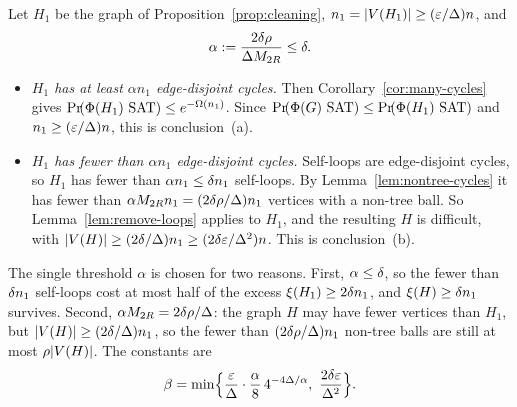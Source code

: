 \documentclass[11pt,a4paper]{article}
\theoremstyle{definition}
\theoremstyle{remark}
\theoremstyle{plain}
\theoremstyle{definition}
\begin{document}
Let \(H_1\) be the graph of Proposition~\ref{prop:cleaning},
\(n_1=|V(H_1)|\ge(\varepsilon/\Delta)n\), and
\[
  \alpha:=\frac{2\delta\rho}{\Delta M_{2R}}\le\delta .
\]
\begin{itemize}
\item \emph{\(H_1\) has at least \(\alpha n_1\) edge-disjoint cycles.} Then
  Corollary~\ref{cor:many-cycles} gives
  \(\Prx{\rform{H_1}\SAT}\le e^{-\Omega(n_1)}\). Since
  \(\Prx{\rform{\Gin}\SAT}\le\Prx{\rform{H_1}\SAT}\) and \(n_1\ge(\varepsilon/\Delta)n\),
  this is conclusion~(a).
\item \emph{\(H_1\) has fewer than \(\alpha n_1\) edge-disjoint cycles.}
  Self-loops are edge-disjoint cycles, so \(H_1\) has fewer than
  \(\alpha n_1\le\delta n_1\) self-loops. By Lemma~\ref{lem:nontree-cycles} it
  has fewer than \(\alpha M_{2R}n_1=(2\delta\rho/\Delta)n_1\) vertices with a
  non-tree ball. So Lemma~\ref{lem:remove-loops} applies to \(H_1\), and the
  resulting \(H\) is difficult, with
  \(|V(H)|\ge(2\delta/\Delta)n_1\ge(2\delta\varepsilon/\Delta^2)n\). This is
  conclusion~(b).
\end{itemize}
The single threshold \(\alpha\) is chosen for two reasons. First,
\(\alpha\le\delta\), so the fewer than \(\delta n_1\) self-loops cost at most
half of the excess \(\xi(H_1)\ge2\delta n_1\), and \(\xi(H)\ge\delta n_1\)
survives. Second, \(\alpha M_{2R}=2\delta\rho/\Delta\): the graph \(H\) may
have fewer vertices than \(H_1\), but \(|V(H)|\ge(2\delta/\Delta)n_1\), so the
fewer than \((2\delta\rho/\Delta)n_1\) non-tree balls are still at most
\(\rho|V(H)|\). The constants are
\[
  \beta=\min\Bigl\{\frac{\excpar}{\degb}\cdot\frac\alpha8\,
  4^{-4\degb/\alpha},\ \frac{2\excd\excpar}{\degb^2}\Bigr\}.
\]
\end{document}
